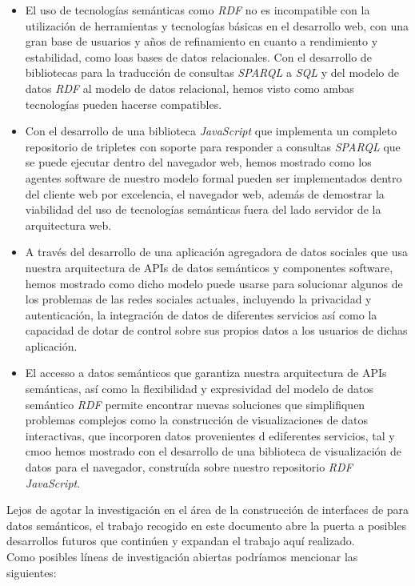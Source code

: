 \begin{itemize}
  \item El uso de tecnolog\'ias sem\'anticas como \textit{RDF} no es incompatible con la utilizaci\'on de herramientas y tecnolog\'ias b\'asicas en el desarrollo web, con una gran base de usuarios y a\~nos de refinamiento en cuanto a rendimiento y estabilidad, como loas bases de datos relacionales. Con el desarrollo de bibliotecas para la traducci\'on de consultas \textit{SPARQL} a \textit{SQL} y del modelo de datos \textit{RDF} al modelo de datos relacional, hemos visto como ambas tecnolog\'ias pueden hacerse compatibles.
  \item Con el desarrollo de una biblioteca \textit{JavaScript} que implementa un completo repositorio de tripletes con soporte para responder a consultas \textit{SPARQL} que se puede ejecutar dentro del navegador web, hemos mostrado como los agentes software de nuestro modelo formal pueden ser implementados dentro del cliente web por excelencia, el navegador web, adem\'as de demostrar la viabilidad del uso de tecnolog\'ias sem\'anticas fuera del lado servidor de la arquitectura web.
  \item A trav\'es del desarrollo de una aplicaci\'on agregadora de datos sociales que usa nuestra arquitectura de APIs de datos sem\'anticos y componentes software, hemos mostrado como dicho modelo puede usarse para solucionar algunos de los problemas de las redes sociales actuales, incluyendo la privacidad y autenticaci\'on, la integraci\'on de datos de diferentes servicios as\'i como la capacidad de dotar de control sobre sus propios datos a los usuarios de dichas aplicaci\'on.
  \item El accesso a datos sem\'anticos que garantiza nuestra arquitectura de APIs sem\'anticas, as\'i como la flexibilidad y expresividad del modelo de datos sem\'antico \textit{RDF} permite encontrar nuevas soluciones que simplifiquen problemas complejos como la construcci\'on de visualizaciones de datos interactivas, que incorporen datos provenientes d ediferentes servicios, tal y cmoo hemos mostrado con el desarrollo de una biblioteca de visualizaci\'on de datos para el navegador, constru\'ida sobre nuestro repositorio \textit{RDF} \textit{JavaScript}.
\end{itemize}

Lejos de agotar la investigaci\'on en el \'area de la construcci\'on de interfaces de para datos sem\'anticos, el trabajo recogido en este documento abre la puerta a posibles desarrollos futuros que contin\'uen y expandan el trabajo aqu\'i realizado.\\
Como posibles l\'ineas de investigaci\'on abiertas podr\'iamos mencionar las siguientes:

